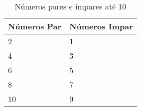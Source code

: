 \begin{table}[!ht]
\centering
\begin{minipage}{8cm}

    \centering
    \caption{Números pares e impares até 10}
    \label{tabela_par_impar}
    \begin{tabular}{l|l}
    \hline
    \textbf{Números Par} & \textbf{Números Impar} \\ \hline
    2 & 1 \\ \hline
    4 & 3 \\ \hline
    6 & 5 \\ \hline
    8 & 7 \\ \hline
    10 & 9 \\ \hline
    \end{tabular}
    
\end{minipage}
\end{table}


